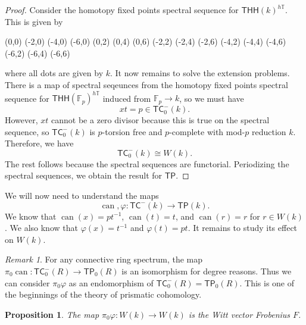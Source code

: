 \documentclass[10pt, oneside]{memoir}
\newtheorem{prop}[thm]{Proposition}
\theoremstyle{definition}
\theoremstyle{remark}
\newtheorem{rmk}[thm]{Remark}
\theoremstyle{plain}
\theoremstyle{definition}
\theoremstyle{remark}
\newcommand{\F}{\mathbb{F}}
\newcommand{\T}{\mathbb{T}}
\newcommand{\on}[1]{\operatorname{#1}}
\newcommand{\ms}[1]{\mathsf{#1}}
\newcommand{\1}{\mathbf{1}}
\newcommand{\2}{\mathbf{2}}
\newcommand{\3}{\mathbf{3}}
\newcommand{\THH}{\ms{THH}}
\newcommand{\TC}{\ms{TC}}
\newcommand{\TP}{\ms{TP}}
\begin{document}
\begin{proof}
    Consider the homotopy fixed points spectral sequence for $\THH(k)^{h\T}$. This is given by
    \begin{center}
        \begin{sseqdata}[classes=fill, class labels={right=0.2em}, name=hfpk, homological Serre
            grading, xscale=1, y axis gap = 2em, axes type = frame] 
            \class["1"](0,0)
            \class["t"](-2,0)
            \class["t^2"](-4,0)
            \class["t^3"](-6,0)
            \class["x"](0,2) 
            \class["x^2"](0,4)
            \class["x^3"](0,6)
            \class(-2,2)
            \class(-2,4)
            \class(-2,6)
            \class(-4,2)
            \class(-4,4)
            \class(-4,6)
            \class(-6,2)
            \class(-6,4)
            \class(-6,6)
        \end{sseqdata} 
        \printpage[name=hfpk, page=2]
    \end{center}
    where all dots are given by $k$. It now remains to solve the extension problems. There is a map of spectral seqeunces from the homotopy fixed points spectral sequence for $\THH(\F_p)^{h\T}$ induced from $\F_p \to k$, so we must have
    \[ xt = p \in \TC_0^-(k). \]
    However, $xt$ cannot be a zero divisor because this is true on the spectral sequence, so $\TC_0^-(k)$ is $p$-torsion free and $p$-complete with mod-$p$ reduction $k$. Therefore, we have
    \[ \TC_0^-(k) \cong W(k). \]
    The rest follows because the spectral sequences are functorial. Periodizing the spectral sequences, we obtain the result for $\TP$.
\end{proof}

We will now need to understand the maps
\[ \on{can}, \varphi \colon \TC^-(k) \to \TP(k). \]
We know that $\on{can}(x) = pt^{-1}$, $\on{can}(t) = t$, and $\on{can}(r) = r$ for $r \in W(k)$. We also know that $\varphi(x) = t^{-1}$ and $\varphi(t) = pt$. It remains to study its effect on $W(k)$.

\begin{rmk}
    For any connective ring spectrum, the map $\pi_0 \on{can} \colon \TC_0^-(R) \to \TP_0(R)$ is an isomorphism for degree reasons. Thus we can consider $\pi_0 \varphi$ as an endomorphism of $\TC_0^-(R) = \TP_0(R)$. This is one of the beginnings of the theory of prismatic cohomology.
\end{rmk}

\begin{prop}
    The map $\pi_0 \varphi \colon W(k) \to W(k)$ is the Witt vector Frobenius $F$.
\end{prop}
\end{document}
